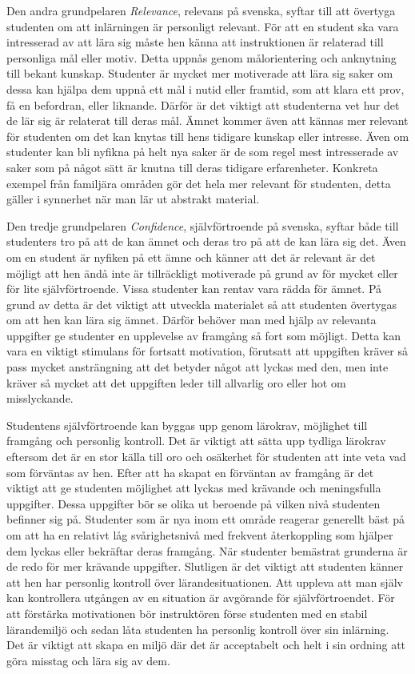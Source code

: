 \documentclass[12pt,a4paper,twoside,openright]{article}
\begin{document}
Den andra grundpelaren \textit{Relevance}, relevans på svenska, syftar
till att övertyga studenten om att inlärningen är personligt relevant.
För att en student ska vara intresserad av att lära sig måste hen
känna att instruktionen är relaterad till personliga mål eller motiv.
Detta uppnås genom målorientering och anknytning till bekant kunskap.
Studenter är mycket mer motiverade att lära sig saker om dessa kan
hjälpa dem uppnå ett mål i nutid eller framtid, som att klara ett
prov, få en befordran, eller liknande. Därför är det viktigt att
studenterna vet hur det de lär sig är relaterat till deras mål. Ämnet
kommer även att kännas mer relevant för studenten om det kan knytas
till hens tidigare kunskap eller intresse. Även om studenter kan bli
nyfikna på helt nya saker är de som regel mest intresserade av saker
som på något sätt är knutna till deras tidigare erfarenheter.
Konkreta exempel från familjära områden gör det hela mer relevant för
studenten, detta gäller i synnerhet när man lär ut abstrakt material.

Den tredje grundpelaren \textit{Confidence}, självförtroende på
svenska, syftar både till studenters tro på att de kan ämnet och deras
tro på att de kan lära sig det. Även om en student är nyfiken på ett
ämne och känner att det är relevant är det möjligt att hen ändå inte
är tillräckligt motiverade på grund av för mycket eller för lite
självförtroende. Vissa studenter kan rentav vara rädda för ämnet. På
grund av detta är det viktigt att utveckla materialet så att studenten
övertygas om att hen kan lära sig ämnet. Därför behöver man med hjälp
av relevanta uppgifter ge studenter en upplevelse av framgång så fort
som möjligt. Detta kan vara en viktigt stimulans för fortsatt
motivation, förutsatt att uppgiften kräver så pass mycket ansträngning
att det betyder något att lyckas med den, men inte kräver så mycket
att det uppgiften leder till allvarlig oro eller hot om misslyckande.

Studentens självförtroende kan byggas upp genom lärokrav, möjlighet
till fram\-gång och personlig kontroll. Det är viktigt att sätta upp
tydliga lärokrav eftersom det är en stor källa till oro och osäkerhet
för studenten att inte veta vad som förväntas av hen. Efter att ha
skapat en förväntan av framgång är det viktigt att ge studenten
möjlighet att lyckas med krävande och meningsfulla uppgifter. Dessa
uppgifter bör se olika ut beroende på vilken nivå studenten befinner
sig på. Studenter som är nya inom ett område reagerar generellt bäst
på om att ha en relativt låg svårighetsnivå med frekvent återkoppling
som hjälper dem lyckas eller bekräftar deras framgång. När studenter
bemästrat grunderna är de redo för mer krävande uppgifter. Slutligen
är det viktigt att studenten känner att hen har personlig kontroll
över lärandesituationen. Att uppleva att man själv kan kontrollera
utgången av en situation är avgörande för självförtroendet. För att
förstärka motivationen bör instruktören förse studenten med en stabil
lärandemiljö och sedan låta studenten ha personlig kontroll över sin
inlärning. Det är viktigt att skapa en miljö där det är acceptabelt
och helt i sin ordning att göra misstag och lära sig av dem.
\end{document}
